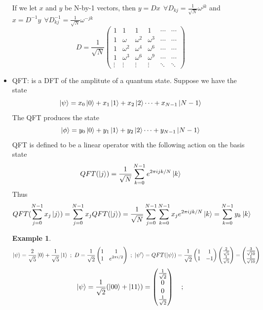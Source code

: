 \documentclass[]{book}
\newtheorem*{example}{Example}
\theoremstyle{nonumberplain}
\begin{document}
\begin{itemize}
If we let $x$ and $y$ be N-by-1 vectors, then $y=Dx\ \ \forall D_{kj}=\frac{1}{\sqrt{N}}\omega^{jk}$ and $x=D^{-1}y\ \ \forall D^{-1}_{kj}=\frac{1}{\sqrt{N}}\omega^{-jk}$
\[
	D = \frac{1}{\sqrt{N}}\begin{pmatrix} 1&1&1&1&\cdots&\cdots \\  1&\omega&\omega^{2}&\omega^{3}&\cdots&\cdots\\  1&\omega^{2}&\omega^{4}&\omega^{6}&\cdots&\cdots\\  1&\omega^{3}&\omega^{6}&\omega^{9}&\cdots&\cdots\\ \vdots & \vdots & \vdots & \vdots &\ddots & \ddots \end{pmatrix} 
\] 
\item QFT: is a DFT of the amplitute of a quantum state. Suppose we have the state
\[
\ket{\psi}=x_{0}\ket{0}+x_{1}\ket{1}+x_{2}\ket{2}\cdots + x_{N-1}\ket{N-1}
\] 
The QFT produces the state
\[
\ket{\phi}=y_{0}\ket{0}+y_{1}\ket{1}+y_{2}\ket{2}\cdots + y_{N-1}\ket{N-1}
\] 
QFT is defined to be a linear operator with the following action on the basis state 
\[
	QFT(\ket{j}) = \frac{1}{\sqrt{N}} \sum^{N-1}_{k=0} e^{2\pi i j k /N}\ket{k}
\]
Thus
\[
	QFT( \sum^{N-1}_{j=0} x_{j}\ket{j}) = \sum^{N-1}_{j=0} x_{j}QFT(\ket{j}) = \frac{1}{\sqrt{N}}\sum^{N-1}_{j=0} \sum^{N-1}_{k=0} x_{j}e^{2\pi ij k/N}\ket{k} = \sum^{N-1}_{k=0} y_{k} \ket{k}
\]
\begin{example} \ \\
	$$\ket{\psi}=\frac{2}{\sqrt{5}}\ket{0}+\frac{1}{\sqrt{5}}\ket{1}\ ;\ D = \frac{1}{\sqrt{2}}\begin{pmatrix} 1&1\\1&e^{2\pi i/2} \end{pmatrix} \ ;\ \ket{\psi'}=QFT(\ket{\psi})= \frac{1}{\sqrt{2}} \begin{pmatrix} 1&1\\1&-1 \end{pmatrix} \begin{pmatrix} \frac{2}{\sqrt{5}}\\ \frac{1}{\sqrt{5}} \end{pmatrix}=\begin{pmatrix} \frac{3}{\sqrt{10}}\\ \frac{1}{\sqrt{10}} \end{pmatrix}  $$
        $$\ket{\psi} = \frac{1}{\sqrt{2}}(\ket{00}+\ket{11}) = \begin{pmatrix} \frac{1}{\sqrt{2}} \\ 0 \\ 0 \\\frac{1}{\sqrt{2}} \end{pmatrix} \quad ; \quad\\
$$
\end{example}
\end{itemize}
\end{document}
